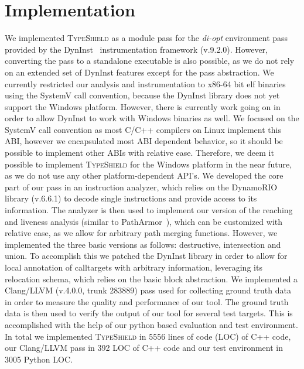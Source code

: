 \section{Implementation}
\label{chapter:Implementation}

We implemented \textsc{TypeShield} as a module pass for the \textit{di-opt} environment pass provided by the 
DynInst~\cite{bernat:dyninst} instrumentation framework (v.9.2.0). 
However, converting the pass to a standalone executable is also possible, as we do not rely on an extended set of DynInst features
except for the pass abstraction.
We currently restricted our analysis and instrumentation to x86-64 bit elf 
binaries using the SystemV call convention, because the DynInst library does not yet support the
Windows platform. However, there is currently work going on in order to allow DynInst to work with
Windows binaries as well. We focused on the SystemV call convention as most C/C++ compilers
on Linux implement this ABI, however we encapsulated most ABI dependent behavior, so it should 
be possible to implement other ABIs with relative ease. Therefore, we deem it possible to implement
\textsc{TypeShield} for the Windows platform in the near future, as we do not use any other 
platform-dependent API's. 
We developed the core part of our pass in an instruction analyzer, which relies on the DynamoRIO~\cite{dynamorio:drmemory} library 
(v.6.6.1) to decode single instructions and provide access to its information. The analyzer is then
used to implement our version of the reaching and liveness analysis (similar to PathArmor~\cite{veen:typearmor}), which can
be customized with relative ease, as we allow for arbitrary path merging functions. However, we implemented 
the three basic versions as follows: destructive, intersection and union.
To accomplish this we patched the DynInst library in order to allow for local annotation of calltargets with arbitrary
information, leveraging its relocation schema, which relies on the basic block abstraction.
We implemented a Clang/LLVM (v.4.0.0, trunk 283889) pass used for 
collecting ground truth data in order to measure the quality and performance of our tool. 
The ground truth data is then used to verify the output of our tool for several test targets. 
This is accomplished with the help of our python based evaluation and test environment.
In total we implemented \textsc{TypeShield} in 5556 lines of code (LOC) of C++ code, our Clang/LLVM pass in 392 LOC
of C++ code and our test environment in 3005 Python LOC. 


